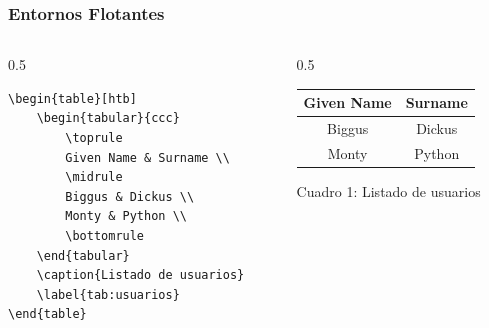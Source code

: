 \documentclass[12pt,aspectratio=169,ignorenonframetext]{ltxbeamer}
\begin{document}
\begin{frame}[fragile]
\frametitle{Entornos Flotantes}

\begin{columns}
    \begin{column}{0.5\textwidth}
        \begin{verbatim}
\begin{table}[htb]
    \begin{tabular}{ccc}
        \toprule
        Given Name & Surname \\
        \midrule
        Biggus & Dickus \\
        Monty & Python \\
        \bottomrule
    \end{tabular}
    \caption{Listado de usuarios}
    \label{tab:usuarios}
\end{table}
        \end{verbatim}
    \end{column}
    \pause
    {\color{gray}\vline}
    \begin{column}{0.5\textwidth}
        \lmr
        \begin{tabular}{cc}
            \toprule
            Given Name & Surname \\
            \midrule
            Biggus & Dickus \\
            Monty & Python \\
            \bottomrule
        \end{tabular}

        \medskip
        \begingroup
        \centering
        Cuadro 1: Listado de usuarios\par
        \endgroup
    \end{column}
\end{columns}
\end{frame}
\end{document}
